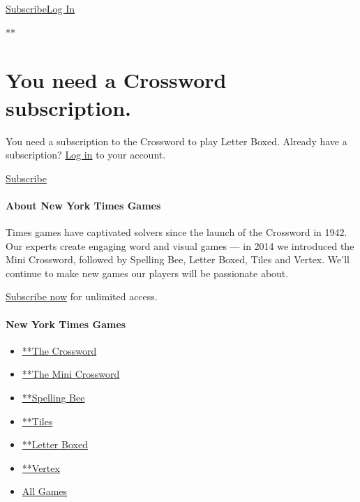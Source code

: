 \href{https://www.nytimes3xbfgragh.onion/subscription/games?campaignId=4QHQ8}{Subscribe}\href{https://myaccount.nytimes3xbfgragh.onion/auth/login?redirect_uri=https\%3A\%2F\%2Fwww.nytimes3xbfgragh.onion\%2Fpuzzles\%2Fletter-boxed\&response_type=cookie\&client_id=games\&application=crosswords\&asset=navigation-bar}{Log
In}

**

\hypertarget{you-need-a-crossword-subscription}{%
\section{You need a Crossword
subscription.}\label{you-need-a-crossword-subscription}}

You need a subscription to the Crossword to play Letter Boxed. Already
have a subscription?
\href{https://myaccount.nytimes3xbfgragh.onion/auth/login?redirect_uri=https\%3A\%2F\%2Fwww.nytimes3xbfgragh.onion\%2Fpuzzles\%2Fletter-boxed\&response_type=cookie\&client_id=games\&application=crosswords\&asset=letter-boxed}{Log
in} to your account.

\href{https://www.nytimes3xbfgragh.onion/subscription/games?campaignId=7JXU8}{Subscribe}

\hypertarget{about-new-york-times-games}{%
\paragraph{About New York Times
Games}\label{about-new-york-times-games}}

Times games have captivated solvers since the launch of the Crossword in
1942. Our experts create engaging word and visual games --- in 2014 we
introduced the Mini Crossword, followed by Spelling Bee, Letter Boxed,
Tiles and Vertex. We'll continue to make new games our players will be
passionate about.

\href{https://www.nytimes3xbfgragh.onion/subscription/games?campaignId=9W9LL}{Subscribe
now} for unlimited access.

\hypertarget{new-york-times-games-1}{%
\paragraph{New York Times Games}\label{new-york-times-games-1}}

\begin{itemize}
\tightlist
\item
  \href{/crosswords/game/daily}{**The Crossword}
\item
  \href{/crosswords/game/mini}{**The Mini Crossword}
\item
  \href{/puzzles/spelling-bee}{**Spelling Bee}
\item
  \href{/puzzles/tiles}{**Tiles}
\item
  \href{/puzzles/letter-boxed}{**Letter Boxed}
\item
  \href{/puzzles/vertex}{**Vertex}
\item
  \href{/crosswords}{All Games}
\end{itemize}

